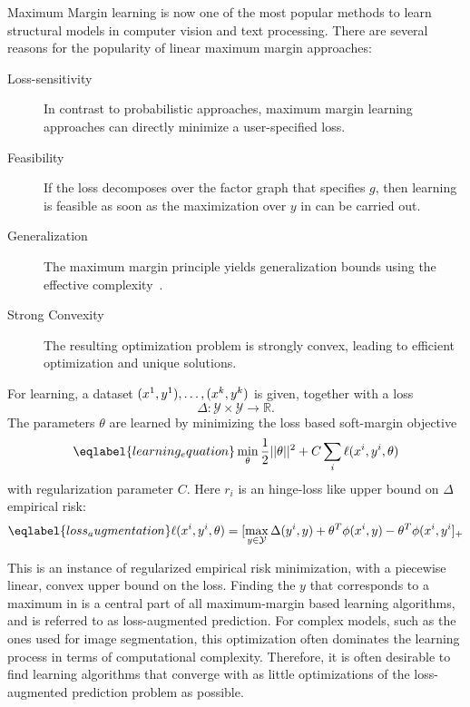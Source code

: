 Maximum Margin learning is now one of the most popular methods to learn
structural models in computer vision and text processing.
There are several reasons for the popularity of linear maximum margin approaches:
\begin{description}
    \item[Loss-sensitivity] In contrast to probabilistic approaches, maximum margin learning approaches can directly
        minimize a user-specified loss.
    \item[Feasibility] If the loss decomposes over the factor graph that
        specifies $g$, then learning is feasible as soon as the maximization
        over $y$ in  can be carried out.
    \item[Generalization] The maximum margin principle yields generalization
        bounds using the effective complexity~\citep{taskar2003max}.
    \item[Strong Convexity] The resulting optimization problem is strongly
        convex, leading to efficient optimization and unique solutions.
\end{description}

For learning, a dataset $(x^{1}, y^{1}),\dotsc,(x^{k}, y^{k})$ is given, together with a loss
\begin{equation}
    \Delta \colon \mathcal{Y} \times \mathcal{Y} \rightarrow \mathbb{R}.
\end{equation}
The parameters $\theta$ are learned by minimizing the loss based soft-margin
objective
\begin{equation}\eqlabel{learning_equation}
    \min_\theta \frac{1}{2} ||\theta||^2 + C \sum_i  \ell(x\hoch{i}, y\hoch{i}, \theta)
\end{equation}
with regularization parameter $C$. Here $r_i$ is an hinge-loss like upper bound
on $\Delta$ empirical risk:
\begin{equation}\eqlabel{loss_augmentation}
    \ell(x\hoch{i}, y\hoch{i}, \theta) = [\max_{y \in \mathcal{Y}} \Delta(y\hoch{i}, y) + \theta^T \phi(x\hoch{i}, y) - \theta^T \phi(x\hoch{i}, y\hoch{i}]_+
\end{equation}

This is an instance of regularized empirical risk minimization, with a
piecewise linear, convex upper bound on the loss. 
Finding the $y$ that corresponds to a maximum in  is
a central part of all maximum-margin based learning algorithms, and is referred to
as loss-augmented prediction. For complex models, such as the ones used for
image segmentation, this optimization often dominates the learning process in
terms of computational complexity.
Therefore, it is often desirable to find learning algorithms that converge with
as little optimizations of the loss-augmented prediction problem as possible.

